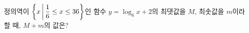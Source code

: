 정의역이 $\left\{x \mkern3mu \middle|\mkern3mu  \dfrac{1}{6}\le x\le 36\right\}$인 함수 $y=\log_6 x+2$의 최댓값을 $M$, 최솟값을 $m$이라 할 때, $M+m$의 값은?
